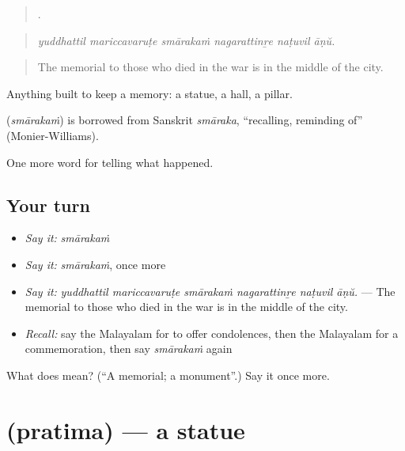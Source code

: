 \begin{quote}
     .
\end{quote}

\begin{quote}
\emph{yuddhattil mariccavaruṭe smārakaṁ nagarattinṟe naṭuvil āṇŭ.}
\end{quote}

\begin{quote}
The memorial to those who died in the war is in the middle of the city.
\end{quote}

Anything built to keep a memory: a statue, a hall, a pillar.

\begin{cousinweb}
\textbf{} (\emph{smārakaṁ}) is borrowed from Sanskrit \emph{smāraka}, \textquotedblleft{}recalling, reminding of\textquotedblright{} (Monier-Williams).
\end{cousinweb}

\begin{grammarlens}[title={What you've built}]
One more word for telling what happened.
\end{grammarlens}

\subsection*{Your turn}
\begin{itemize}
\raggedright
  \item \emph{Say it:} \emph{smārakaṁ}
  \item \emph{Say it:} \emph{smārakaṁ}, once more
  \item \emph{Say it:} \emph{yuddhattil mariccavaruṭe smārakaṁ nagarattinṟe naṭuvil āṇŭ.} — The memorial to those who died in the war is in the middle of the city.
  \item \emph{Recall:} say the Malayalam for to offer condolences, then the Malayalam for a commemoration, then say \emph{smārakaṁ} again
\end{itemize}

\begin{tcolorbox}[breakable,colback=teal!4,colframe=teal!35!black,title={Before you move on}]
What does  mean? (\textquotedblleft{}A memorial; a monument\textquotedblright{}.) Say it once more.
\end{tcolorbox}
\section[\texorpdfstring{\ml{പ്രതിമ} (pratima)}{പ്രതിമ (pratima)}]{ (pratima) — a statue}

